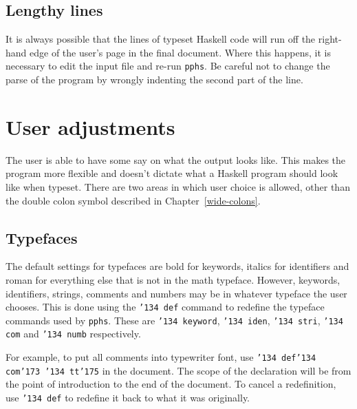 \subsection{Lengthy lines}

It is always possible that the lines of typeset Haskell code will run off
the right-hand edge of the user's page in the final document.  Where this happens,
it is necessary to edit the input file and re-run {\tt pphs}.  Be careful not to
change the parse of the program by wrongly indenting the second part of the line.

\section{User adjustments} \label{user-adj}

The user is able to have some say on what the output looks like.
This makes the program more flexible and doesn't dictate what a
Haskell program should look like when typeset.  There are two areas in which user
choice is allowed, other than the double colon symbol described in Chapter~\ref{wide-colons}.

\subsection{Typefaces}

The default settings for typefaces are bold for keywords, italics for identifiers and
roman for everything else that is not in the math typeface.  However, keywords, identifiers,
strings, comments and numbers may be in whatever typeface the user chooses.
This is done using the {\tt \char'134 def} command to redefine the typeface commands
used by {\tt pphs}.  These are {\tt \char'134 keyword}, {\tt \char'134 iden},
{\tt \char'134 stri}, {\tt \char'134 com} and {\tt \char'134 numb} respectively.

For example, to put all comments into typewriter font, use
{\tt \char'134 def\char'134 com\char'173 \char'134 tt\char'175} in
the document.  The scope of the declaration will be from the point of introduction to
the end of the document.  To cancel a redefinition, use {\tt \char'134 def} to
redefine it back to what it was originally.


